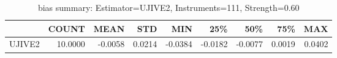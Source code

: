 \begin{table}[ht]
\centering
\caption{bias summary: Estimator=UJIVE2, Instruments=111, Strength=0.60}
\begin{tabular}{lrrrrrrrr}
\toprule
 & COUNT & MEAN & STD & MIN & 25\% & 50\% & 75\% & MAX \\
\midrule
UJIVE2 & 10.0000 & -0.0058 & 0.0214 & -0.0384 & -0.0182 & -0.0077 & 0.0019 & 0.0402 \\
\bottomrule
\end{tabular}
\end{table}

